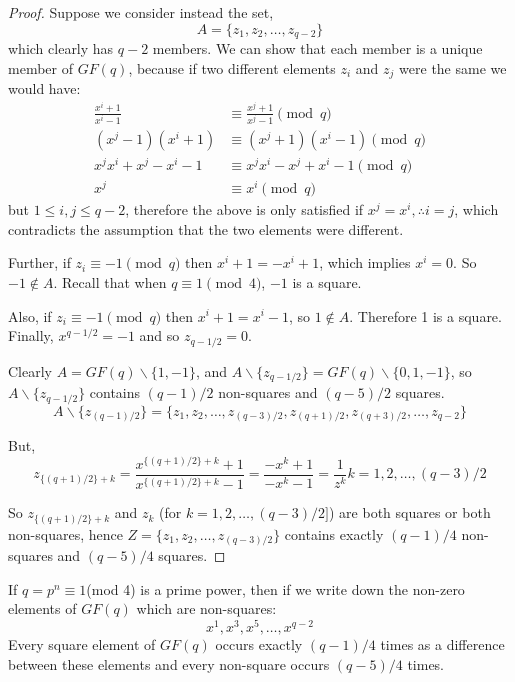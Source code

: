 \begin{proof}
Suppose we consider instead the set,
\begin{equation}
  A = \{z_1, z_2, \ldots, z_{q - 2}\}
\end{equation}
which clearly has $q - 2$ members.
We can show that each member is a unique member of $GF(q)$, because if two different elements $z_i$ and $z_j$ were the same we would have:
\begin{align}
\frac{x^i + 1}{x^i - 1} &\equiv \frac{x^j + 1}{x^j - 1}\pmod q \\
         (x^j-1)(x^i+1) &\equiv (x^j+1)(x^i-1)\pmod q \\
       x^jx^i+x^j-x^i-1 &\equiv x^jx^i - x^j + x^i -1\pmod q \\
                    x^j &\equiv x^i\pmod q
\end{align}
but $1 \leq i, j \leq q - 2$, therefore the above is only satisfied if $x^j = x^i, \therefore i = j$, which contradicts the assumption that the two elements were different.

Further, if $z_i \equiv -1\pmod q$ then $x^i + 1 = -x^i + 1$, which implies $x^i = 0$.
So $-1 \notin A$.
Recall that when $q \equiv 1\pmod 4$, $-1$ is a square.

Also, if $z_i \equiv -1\pmod q$ then $x^i + 1 = x^i - 1$, so $1 \notin A$.
Therefore 1 is a square.
Finally, $x^{q - 1/2} = -1$ and so $z_{q - 1/2} = 0$.

Clearly $A = GF(q) \backslash \{1, -1\}$, and $A \backslash \{z_{q - 1/2}\} = GF(q) \backslash \{0, 1, -1\}$, so $A \backslash \{z_{q - 1/2}\}$ contains $(q - 1)/2$ non-squares and $(q - 5)/2$ squares.
\begin{equation}
A \backslash \{z_{(q - 1)/2}\} = \{z_1, z_2, \ldots, z_{(q - 3)/2}, z_{(q + 1)/2}, z_{(q + 3)/2}, \ldots, z_{q - 2}\}
\end{equation}

But,
\begin{equation}
z_{\{(q + 1)/2\} + k} = \frac{x^{\{(q + 1)/2\} + k} + 1}{x^{\{(q + 1)/2\} + k} - 1} = \frac{-x^k + 1}{-x^k - 1} = \frac{1}{z^k} k = 1, 2, \ldots, (q - 3)/2
\end{equation}

So $z_{\{(q + 1)/2\} + k}$ and $z_k$ (for $k = 1, 2, \ldots, (q - 3)/2]$) are both squares or both non-squares, hence $Z = \{z_1, z_2, \ldots, z_{(q - 3)/2}\}$ contains exactly $(q - 1)/4$ non-squares and $(q - 5)/4$ squares.
\end{proof}

\begin{corollary}
If $q = p^n \equiv 1$(mod 4) is a prime power, then if we write down the non-zero elements of $GF(q)$ which are non-squares:
\begin{equation}
x^1, x^3, x^5, \ldots, x^{q - 2}
\end{equation}
Every square element of $GF(q)$ occurs exactly $(q - 1)/4$ times as a difference between these elements and every non-square occurs $(q - 5)/4$ times.
\label{cor:non-squares}
\end{corollary}

